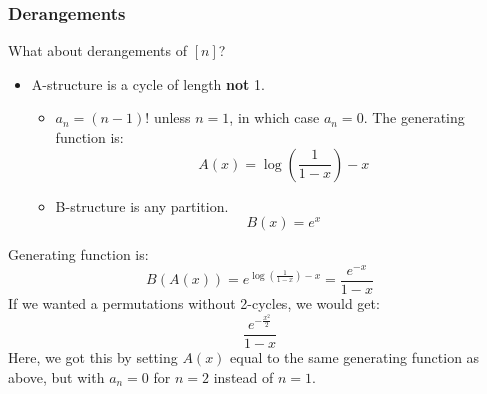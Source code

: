 \documentclass[letterpaper]{article}
\begin{document}
\subsubsection{Derangements}
What about derangements of $[n]$? 
\begin{itemize}
    \item A-structure is a cycle of length \textbf{not} 1.
    \begin{itemize}
        \item $a_n = (n - 1)!$ unless $n = 1$, in which case $a_n = 0$. The generating function is:
        \[A(x) = \log\left(\frac{1}{1 - x}\right) - x\]

        \item B-structure is any partition. 
        \[B(x) = e^x\]
    \end{itemize}
\end{itemize}
Generating function is:
\[B(A(x)) = e^{\log\left(\frac{1}{1 - x}\right) - x} = \frac{e^{-x}}{1 - x}\]
If we wanted a permutations without 2-cycles, we would get:
\[\frac{e^{-\frac{x^2}{2}}}{1 - x}\]
Here, we got this by setting $A(x)$ equal to the same generating function as above, but with $a_n = 0$ for $n = 2$ instead of $n = 1$.
\end{document}
